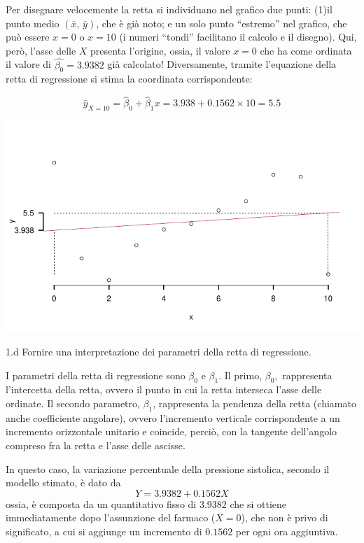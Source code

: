\documentclass[
  11pt,
]{book}
\theoremstyle{mytheoremstyle}
\theoremstyle{mydefstyle}
\newenvironment{sol}
  {
  \begin{tcolorbox}[enhanced,breakable,arc=0.1mm,boxrule=1pt,colback=white,colframe=iblue,
  title=\bf \fontfamily{lmss}\selectfont \hspace{.5 cm} Soluzione,drop fuzzy shadow]

}{
\end{tcolorbox}
  }
\begin{document}
\begin{sol}

Per disegnare velocemente la retta si individuano nel grafico
due punti: (1)il punto medio \((\bar{x},\, \bar{y})\), che è già
noto; e un solo punto ``estremo'' nel grafico, che può essere \(x=0\)
o \(x=10\) (i numeri ``tondi'' facilitano il calcolo e il disegno).
Qui, però, l'asse delle \(X\) presenta l'origine, ossia,
il valore \(x=0\) che ha come ordinata il valore di
\(\widehat{\beta_{0}}=3.9382\) già calcolato!
Diversamente, tramite l'equazione della retta di
regressione si stima la coordinata corrispondente:

\[\hat y_{X= 10 }=\hat\beta_0+\hat\beta_1 x= 3.938 + 0.1562 \times 10 = 5.5 \]

\begin{center}\includegraphics{Esami_passati_con_soluzioni_files/figure-latex/06-regr-54-1} \end{center}

\end{sol}

1.d Fornire una interpretazione dei parametri della retta di regressione.

\begin{sol}
I parametri della retta di regressione sono \(\beta_{0}\) e \(\beta_{1}\).
Il primo, \(\beta_{0},\) rappresenta l'intercetta della retta,
ovvero il punto in cui la retta interseca l'asse delle ordinate.
Il secondo parametro, \(\beta_{1}\), rappresenta la pendenza della
retta (chiamato anche coefficiente angolare), ovvero l'incremento
verticale corrispondente a un incremento orizzontale unitario e
coincide, perciò, con la tangente dell'angolo compreso fra la
retta e l'asse delle ascisse.

In questo caso, la variazione percentuale della pressione sistolica,
secondo il modello stimato, è dato da
\[Y= 3.9382 + 0.1562 X\]
ossia, è composta da un quantitativo fisso di \(3.9382\) che si ottiene
immediatamente dopo l'assunzione del farmaco (\(X=0\)), che non è privo
di significato, a cui si aggiunge un incremento di \(0.1562\) per ogni ora
aggiuntiva.

\end{sol}
\end{document}
